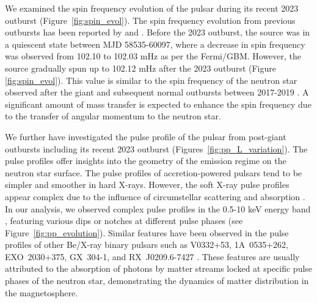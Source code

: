 \documentclass[twocolumn,trackchanges]{aastex631}
\begin{document}
We examined the spin frequency evolution of the pulsar during its recent 2023 outburst  (Figure~\ref{fig:spin_evol}). The spin frequency evolution from previous outbursts has been reported by  \citet{2018ApJ...863....9W} and \citet{2023MNRAS.522.6115S}. Before the 2023 outburst, the source was in a quiescent state between MJD 58535-60097, where a decrease in spin frequency was observed from 102.10 to 102.03 mHz as per the Fermi/GBM. However, the source gradually spun up to 102.12 mHz after the 2023 outburst (Figure \ref{fig:spin_evol}). This value is similar to the spin frequency of the neutron star observed after the giant and subsequent normal outbursts between 2017-2019 \citep{2018ApJ...863....9W,2023ApJ...950...42L, 2023MNRAS.522.6115S}. A significant amount of mass transfer is expected to enhance the spin frequency due to the transfer of angular momentum to the neutron star. 




We further have investigated the pulse profile of the pulsar from post-giant outbursts including its recent 2023 outburst  (Figures~\ref{fig:pp_L_variation}). The pulse profiles offer insights into the geometry of the emission regime on the neutron star surface. The pulse profiles of accretion-powered pulsars tend to be simpler and smoother in hard X-rays. However, the soft X-ray pulse profiles appear complex due to the influence of circumstellar scattering and absorption \citep{1983ApJ...270..711W}. In our analysis, we observed complex pulse profiles in the 0.5-10 keV energy band , featuring various dips or notches at different pulse phases (see Figure~\ref{fig:pp_evolution}). Similar features have been observed in the pulse profiles of other Be/X-ray binary pulsars such as V0332+53, 1A~0535+262, EXO~2030+375, GX~304-1, and RX~J0209.6-7427 \citep{2006MNRAS.371...19T, 2008ApJ...672..516N,2013ApJ...764..158N, 2015RAA....15..537N, Epili2017MNRAS.472.3455E, Jaisawal2016MNRAS.457.2749J, 2020MNRAS.494.5350V}. These features are usually attributed to the absorption of photons by matter streams locked at specific pulse phases of the neutron star, demonstrating the dynamics of matter distribution in the magnetosphere.
\end{document}
